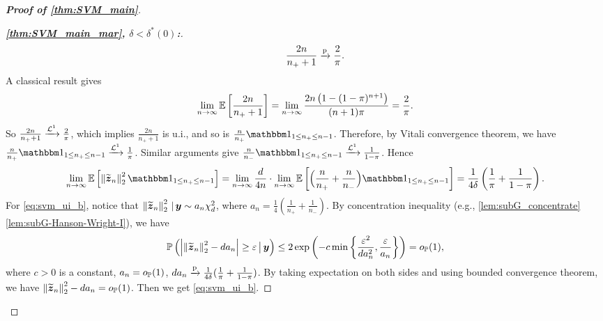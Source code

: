 \begin{proof}[\textbf{Proof of \cref{thm:SVM_main}}]
\begin{proof}[\textbf{\emph{\ref{thm:SVM_main_mar}, $\delta < \delta^*(0)$:}}]
\begin{equation*}
    \qquad
    \frac{2n}{n_+ + 1} \conp \frac{2}{\pi}.
\end{equation*}
A classical result \cite{chao1972negative} gives
\begin{equation*}
    \lim_{n \to \infty} \E\left[ \frac{2n}{n_+ + 1} \right]
    = \lim_{n \to \infty} \frac{2n\left( 1 - (1-\pi)^{n+1} \right)}{(n+1)\pi} = \frac{2}{\pi}.
\end{equation*}
So $\frac{2n}{n_+ + 1} \conL{1} \frac{2}{\pi}$, which implies $\frac{2n}{n_+ + 1}$ is u.i., and so is $\frac{n}{n_+} \ind_{1 \le n_+ \le n-1}$. Therefore, by Vitali convergence theorem, we have $\frac{n}{n_+} \ind_{1 \le n_+ \le n-1} \conL{1} \frac{1}{\pi}$. Similar arguments give $\frac{n}{n_-} \ind_{1 \le n_+ \le n-1} \conL{1} \frac{1}{1-\pi}$. Hence
\begin{equation*}
    \lim_{n \to \infty} \E \left[ \norm{ \wt \zz_n }_2^2 \ind_{1 \le n_+ \le n-1} \right]
    = \lim_{n \to \infty} \frac{d}{4n} \cdot \lim_{n \to \infty} \E \left[ \Bigl( \frac{n}{n_+} + \frac{n}{n_-} \Bigr) \ind_{1 \le n_+ \le n-1} \right]
    = \frac{1}{4\delta} \left( \frac{1}{\pi} + \frac{1}{1-\pi} \right).
\end{equation*}
For \cref{eq:svm_ui_b}, notice that $\norm{ \wt \zz_n }_2^2 \,|\, \yy \sim a_n \chi_d^2$, where $a_n = \frac{1}{4} ( \frac{1}{n_+} + \frac{1}{n_-})$. By concentration inequality (e.g., \cref{lem:subG_concentrate}\ref{lem:subG-Hanson-Wright-I}), we have
\begin{equation*}
    \P\left( \abs{ \norm{ \wt \zz_n }_2^2 - d a_n } \ge \varepsilon \,\big|\, \yy \right) 
    \le 2\exp\left( -c \min\left\{ \frac{\varepsilon^2}{d a_n^2}, \frac{\varepsilon}{a_n} \right\} \right)
    = o_\P(1),
\end{equation*}
where $c > 0$ is a constant, $a_n = o_\P(1)$, $d a_n \conp \frac{1}{4\delta} ( \frac{1}{\pi} + \frac{1}{1-\pi} )$. By taking expectation on both sides and using bounded convergence theorem, we have $\norm{ \wt \zz_n }_2^2 - d a_n = o_\P(1)$. Then we get \cref{eq:svm_ui_b}.

\end{proof}
\end{proof}
